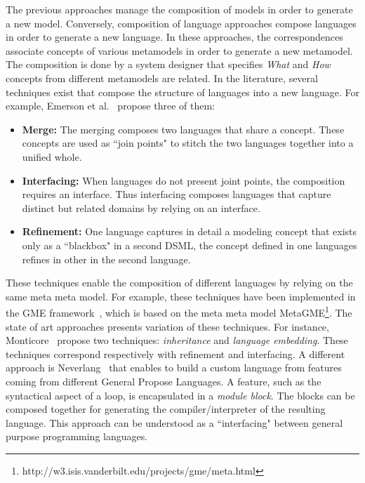 
The previous approaches manage the composition of models in order to generate a new model. Conversely, composition of language approaches compose languages in order to generate a new language. In these approaches, the correspondences associate concepts of various metamodels in order to generate a new metamodel. The composition is done by a system designer that specifies \emph{What} and \emph{How} concepts from different metamodels are related. In the literature, several techniques exist that compose the structure of languages into a new language. For example, Emerson et al.~\cite{metamodelcompo} propose three of them:
\begin{itemize}
	\item \textbf{Merge:} The merging composes two languages that share a concept. These concepts are used as ``join points" to stitch the two languages together into a unified whole.
	\item \textbf{Interfacing:} When languages do not present joint points, the composition requires an interface. Thus interfacing composes languages that capture distinct but related domains by relying on an interface.
	\item \textbf{Refinement:} One language captures in detail a modeling concept that exists only as a ``blackbox" in a second DSML, \ie the concept defined in one languages refines in other in the second language.
\end{itemize} 
These techniques enable the composition of different languages by relying on the same meta meta model. For example, these techniques have been implemented in the GME framework~\cite{metamodelcompo}, which is based on the meta meta model MetaGME\footnote{http://w3.isis.vanderbilt.edu/projects/gme/meta.html}. The state of art approaches presents variation of these techniques. For instance, Monticore~\cite{monticore} propose two techniques: \emph{inheritance} and \emph{language embedding}. These techniques correspond respectively with refinement and interfacing. A different approach is Neverlang~\cite{neverlang} that enables to build a custom language from features coming from different General Propose Languages. A feature, such as the syntactical aspect of a loop, is encapsulated in a \emph{module block}. The blocks can be composed together for generating the compiler/interpreter of the resulting language. This approach can be understood as a ``interfacing" between general purpose programming languages.

